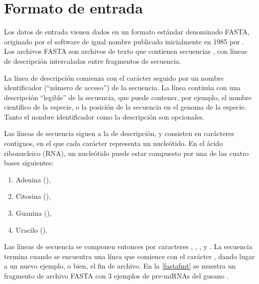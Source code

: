 \section{Formato de entrada}
Los datos de entrada vienen dados en un formato estándar denominado
FASTA, originado por el software de igual nombre publicado
inicialmente en 1985 por \citeauthor{fasta} \cite{fasta}.  Los
archivos FASTA son archivos de texto que contienen secuencias
, con líneas de descripción intercaladas entre fragmentos
de secuencia.

La línea de descripción comienza con el carácter \mono{>} seguido por
un nombre identificador (``número de acceso'') de la secuencia.  La
línea continúa con una descripción ``legible'' de la secuencia, que
puede contener, por ejemplo, el nombre científico de la especie, o la
posición de la secuencia en el genoma de la especie.  Tanto el nombre
identificador como la descripción son opcionales.

Las líneas de secuencia siguen a la de descripción, y consisten en
carácteres contiguos, en el que cada carácter representa un
nucleótido. En el ácido ribonucleico (RNA), un nucleótido puede estar
compuesto por una de las cuatro bases siguientes:

\begin{enumerate}
\item Adenina (),
\item Citosina (),
\item Guanina (),
\item Uracilo ().
\end{enumerate}
Las líneas de secuencia se componen entonces por caracteres ,
, , y .  La secuencia termina cuando se
encuentra una línea que comience con el carácter \mono{>}, dando lugar
a un nuevo ejemplo, o bien, el fin de archivo.
En la \autoref{fastafmt} se muestra un fragmento de archivo FASTA
con 3 ejemplos de pre-miRNAs del gusano .
